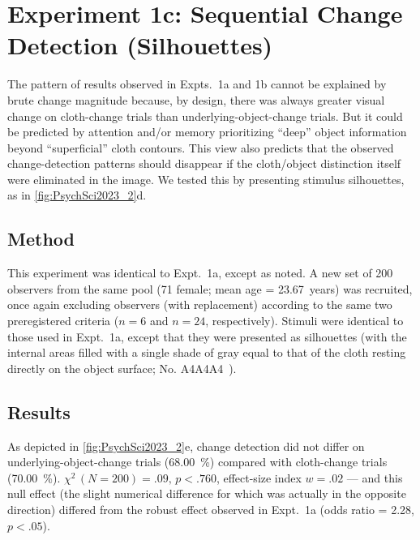 \section{Experiment 1c: Sequential Change Detection (Silhouettes)}

The pattern of results observed in Expts.~1a and 1b cannot be explained by brute change magnitude because, by design, there was always greater visual change on cloth-change trials than underlying-object-change trials. But it could be predicted by attention and/or memory prioritizing “deep” object information beyond “superficial” cloth contours. This view also predicts that the observed change-detection patterns should disappear if the cloth/object distinction itself were eliminated in the image. We tested this by presenting stimulus silhouettes, as in \cref{fig:PsychSci2023_2}d.

\subsection{Method}

This experiment was identical to Expt.~1a, except as noted. A new set of 200 observers from the same pool (71 female; mean age = 23.67~years) was recruited, once again excluding observers (with replacement) according to the same two preregistered criteria ($n = 6$ and $n = 24$, respectively). Stimuli were identical to those used in Expt.~1a, except that they were presented as silhouettes (with the internal areas filled with a single shade of gray equal to that of the cloth resting directly on the object surface; No. A4A4A4~).


\subsection{Results}

As depicted in \cref{fig:PsychSci2023_2}e, change detection did not differ on underlying-object-change trials (\qty{68.00}{\percent}) compared with cloth-change trials (\qty{70.00}{\percent}). $\chi^2\,(N = 200) = .09,\,p < .760$, effect-size index $w = .02$ --- and this null effect (the slight numerical difference for which was actually in the opposite direction) differed from the robust effect observed in Expt.~1a (odds ratio = 2.28, $p < .05$).

